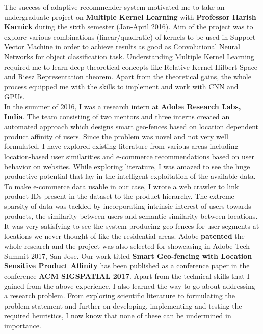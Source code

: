 \documentclass[letterpaper]{article}
\begin{document}
The success of adaptive recommender system motivated me to take an undergraduate project on \textbf{Multiple Kernel Learning} with \textbf{Professor Harish Karnick} during the sixth semester (Jan-April 2016). Aim of the project was to explore various combinations (linear/quadratic) of kernels to be used in Support Vector Machine in order to achieve results as good as Convolutional Neural Networks for object classification task. Understanding Multiple Kernel Learning required me to learn deep theoretical concepts like Relative Kernel Hilbert Space and Riesz Representation theorem. Apart from the theoretical gains, the whole process equipped me with the skills to implement and work with CNN and GPUs.\\

In the summer of 2016, I was a research intern at \textbf{Adobe Research Labs, India}. The team consisting of two mentors and three interns created an automated approach which designs smart geo-fences based on location dependent product affinity of users. Since the problem was novel and not very well formulated, I have explored existing literature from various areas including location-based user similarities and e-commerce recommendations based on user behavior on websites. While exploring literature, I was amazed to see the huge productive potential that lay in the intelligent exploitation of the available data. To make e-commerce data usable in our case, I wrote a web crawler to link product IDs present in the dataset to the product hierarchy. The extreme sparsity of data was tackled by incorporating intrinsic interest of users towards products, the similarity between users and semantic similarity between locations. It was very satisfying to see the system producing geo-fences for user segments at locations we never thought of like the residential areas. Adobe \textbf{patented} the whole research and the project was also selected for showcasing in Adobe Tech Summit 2017, San Jose. Our work titled \textbf{Smart Geo-fencing with Location Sensitive Product Affinity} has been published as a conference paper in the conference \textbf{ACM SIGSPATIAL 2017}. Apart from the technical skills that I gained from the above experience, I also learned the way to go about addressing a research problem. From exploring scientific literature to formulating the problem statement and further on developing, implementing and testing the required heuristics, I now know that none of these can be undermined in importance.\\
\end{document}
